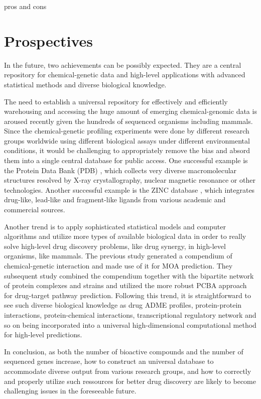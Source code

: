 \documentclass[12pt,conference,compsocconf]{article}
\begin{document}
pros and cons

\section{Prospectives}

In the future, two achievements can be possibly expected. They are a central repository for chemical-genetic data and high-level applications with advanced statistical methods and diverse biological knowledge.

The need to establish a universal repository for effectively and efficiently warehousing and accessing the huge amount of emerging chemical-genomic data is aroused recently given the hundreds of sequenced organisms including mammals. Since the chemical-genetic profiling experiments were done by different research groups worldwide using different biological assays under different environmental conditions, it would be challenging to appropriately remove the bias and absord them into a single central database for public access. One successful example is the Protein Data Bank (PDB) \citep{105}, which collects very diverse macromolecular structures resolved by X-ray crystallography, nuclear magnetic resonance or other technologies. Another successful example is the ZINC database \citep{532}, which integrates drug-like, lead-like and fragment-like ligands from various academic and commercial sources.

Another trend is to apply sophisticated statistical models and computer algorithms and utilize more types of available biological data in order to really solve high-level drug discovery problems, like drug synergy, in high-level organisms, like mammals. The previous study \citep{1078}  generated a compendium of chemical-genetic interaction and made use of it for MOA prediction. They subsequent study \citep{1079} combined the compendium together with the bipartite network of protein complexes and strains and utilized the more robust PCBA approach for drug-target pathway prediction. Following this trend, it is straightforward to see such diverse biological knowledge as drug ADME profiles, protein-protein interactions, protein-chemical interactions, transcriptional regulatory network and so on being incorporated into a universal high-dimensional computational method for high-level predictions.

In conclusion, as both the number of bioactive compounds and the number of sequenced genes increase, how to construct an universal database to accommodate diverse output from various research groups, and how to correctly and properly utilize such ressources for better drug discovery are likely to become challenging issues in the foreseeable future.



\end{document}
